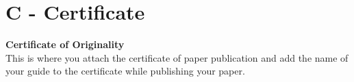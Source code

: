 \documentclass[12pt,a4paper]{report}
\begin{document}
\newpage
\section*{C - Certificate}
\textbf{Certificate of Originality}\\
This is where you attach the certificate of paper publication and add the name of your guide to the certificate while publishing your paper.
\end{document}
